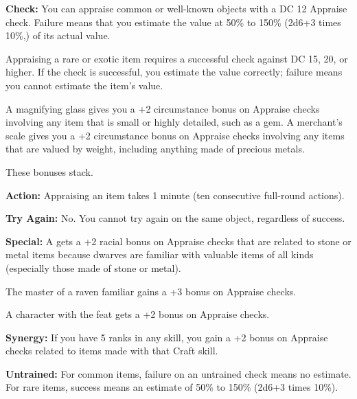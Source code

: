 
\textbf{Check:} You can appraise common or well-known objects with a DC 12 Appraise 
check. Failure means that you estimate the value at 50\% to 150\% (2d6+3 times 
10\%,) of its actual value.

Appraising a rare or exotic item requires a successful check against DC 15, 20, 
or higher. If the check is successful, you estimate the value correctly; failure 
means you cannot estimate the item's value.

A magnifying glass gives you a +2 circumstance bonus on Appraise checks involving 
any item that is small or highly detailed, such as a gem. A merchant's scale gives 
you a +2 circumstance bonus on Appraise checks involving any items that are valued 
by weight, including anything made of precious metals.

These bonuses stack.

\textbf{Action:} Appraising an item takes 1 minute (ten consecutive full-round 
actions).

\textbf{Try Again:} No. You cannot try again on the same object, regardless of 
success.

\textbf{Special:} A  gets a +2 racial bonus on Appraise checks that are related 
to stone or metal items because dwarves are familiar with valuable items of all 
kinds (especially those made of stone or metal).

The master of a raven familiar gains a +3 bonus on Appraise checks.

A character with the  feat gets a +2 bonus on Appraise checks.

\textbf{Synergy:} If you have 5 ranks in any  skill, you gain a +2 bonus on 
Appraise checks related to items made with that Craft skill.

\textbf{Untrained:} For common items, failure on an untrained check means no estimate. 
For rare items, success means an estimate of 50\% to 150\% (2d6+3 times 10\%).
